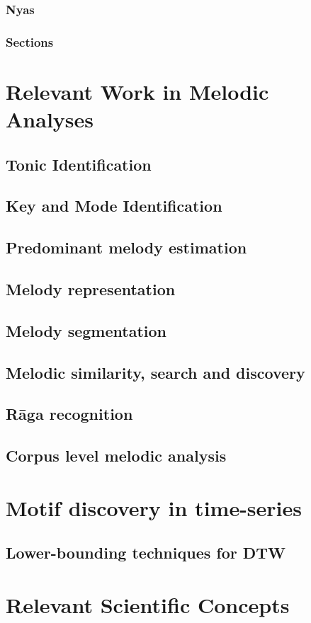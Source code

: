 \subsubsection{Nyas}
\label{sec:backgroung_nyas_description}

\subsubsection{Sections}

\section{Relevant Work in Melodic Analyses}
\subsection{Tonic Identification}
\subsection{Key and Mode Identification}
\subsection{Predominant melody estimation}
\subsection{Melody representation}
\subsection{Melody segmentation}
\subsection{Melodic similarity, search and discovery}
\subsection{R\={a}ga recognition}
\subsection{Corpus level melodic analysis}

\section{Motif discovery in time-series}
\subsection{Lower-bounding techniques for DTW}

\section{{Relevant Scientific Concepts}}